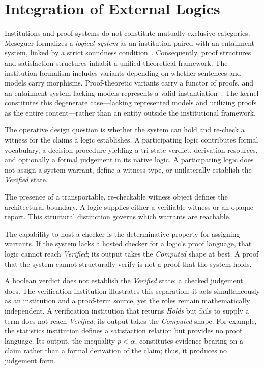 \documentclass[manuscript,nonacm=true]{acmart}
\begin{document}
\section{Integration of External Logics}

Institutions and proof systems do not constitute mutually exclusive categories. Meseguer formalizes a \emph{logical system} as an institution paired with an entailment system, linked by a strict soundness condition~\cite{mes89}. Consequently, proof structures and satisfaction structures inhabit a unified theoretical framework. The institution formalism includes variants depending on whether sentences and models carry morphisms. Proof-theoretic variants carry a functor of proofs, and an entailment system lacking models represents a valid instantiation~\cite{whatisalogic}. The kernel constitutes this degenerate case---lacking represented models and utilizing proofs as the entire content---rather than an entity outside the institutional framework.

The operative design question is whether the system can hold and re-check a witness for the claims a logic establishes. A participating logic contributes formal vocabulary, a decision procedure yielding a tri-state verdict, derivation resources, and optionally a formal judgement in its native logic. A participating logic does not assign a system warrant, define a witness type, or unilaterally establish the \emph{Verified} state.

The presence of a transportable, re-checkable witness object defines the architectural boundary. A logic supplies either a verifiable witness or an opaque report. This structural distinction governs which warrants are reachable.

The capability to host a checker is the determinative property for assigning warrants. If the system lacks a hosted checker for a logic's proof language, that logic cannot reach \emph{Verified}; its output takes the \emph{Computed} shape at best. A proof that the system cannot structurally verify is not a proof that the system holds.

A boolean verdict does not establish the \emph{Verified} state; a checked judgement does. The verification institution illustrates this separation: it acts simultaneously as an institution and a proof-term source, yet the roles remain mathematically independent. A verification institution that returns \emph{Holds} but fails to supply a term does not reach \emph{Verified}; its output takes the \emph{Computed} shape. For example, the statistics institution defines a satisfaction relation but provides no proof language. Its output, the inequality $p < \alpha$, constitutes evidence bearing on a claim rather than a formal derivation of the claim; thus, it produces no judgement form.
\end{document}

